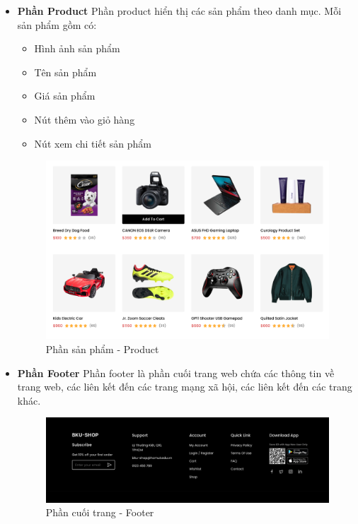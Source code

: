 \begin{itemize}
\begin{figure}[H]
    \end{figure}
    \item \textbf{Phần Product}
    \newline
    Phần product hiển thị các sản phẩm theo danh mục. Mỗi sản phẩm gồm có:
    \begin{itemize}
        \item Hình ảnh sản phẩm
        \item Tên sản phẩm
        \item Giá sản phẩm
        \item Nút thêm vào giỏ hàng
        \item Nút xem chi tiết sản phẩm
    \end{itemize}
    \begin{figure}[H]
        \begin{center}
        \includegraphics[scale=0.7]{images/hieu/chap-4/product.png}
        \vspace*{5mm}
        \caption{Phần sản phẩm - Product}
        \end{center}
    \end{figure}
    \item \textbf{Phần Footer}
    \newline
    Phần footer là phần cuối trang web chứa các thông tin về trang web, các liên kết đến các trang mạng xã hội, các liên kết đến các trang khác.
    \begin{figure}[H]
        \begin{center}
        \includegraphics[scale=0.5]{images/hieu/chap-4/footer.png}
        \vspace*{5mm}
        \caption{Phần cuối trang - Footer}
        \end{center}
    \end{figure}
\end{itemize}